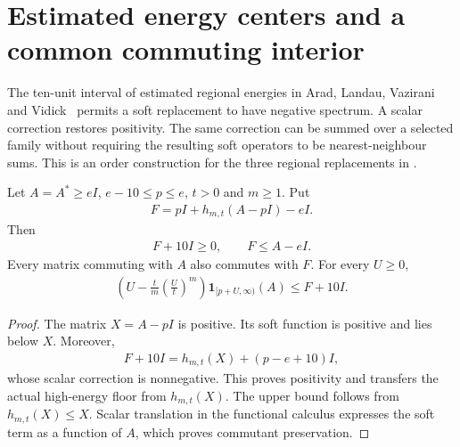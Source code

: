 \section{Estimated energy centers and a common commuting interior}
\label{sec:soft_commuting_family}

The ten-unit interval of estimated regional energies in
Arad, Landau, Vazirani and Vidick~\cite[lines 1178--1185]{Arad2016RigorousRG}
permits a soft replacement to have negative spectrum. A scalar correction
restores positivity. The same correction can be summed over a selected
family without requiring the resulting soft operators to be nearest-neighbour
sums. This is an order construction for the three regional replacements
in \cite[lines 1373--1392]{Arad2016RigorousRG}.

\begin{lemma}
    \label{lem:soft_estimated_center_order}
    \leanok
    Let $A=A^*\geq eI$, $e-10\leq p\leq e$, $t>0$ and $m\geq1$.
    Put
    \begin{align}
        F=pI+h_{m,t}(A-pI)-eI.
    \end{align}
    Then
    \begin{align}
        F+10I\geq0,\qquad F\leq A-eI.
    \end{align}
    Every matrix commuting with $A$ also commutes with $F$.
    For every $U\geq0$,
    \begin{align}
        \left(U-\frac{t}{m}\left(\frac Ut\right)^m\right)
        \mathbf1_{[p+U,\infty)}(A)\leq F+10I.
    \end{align}
\end{lemma}
\begin{proof}\leanok
    The matrix $X=A-pI$ is positive. Its soft function is positive and
    lies below $X$. Moreover,
    \begin{align}
        F+10I=h_{m,t}(X)+(p-e+10)I,
    \end{align}
    whose scalar correction is nonnegative. This proves positivity
    and transfers the actual high-energy floor from $h_{m,t}(X)$.
    The upper bound follows from $h_{m,t}(X)\leq X$.
    Scalar translation in the functional calculus expresses the soft
    term as a function of $A$, which proves commutant preservation.
\end{proof}

